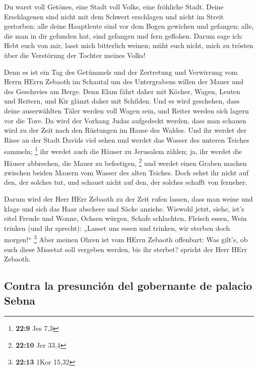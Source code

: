  Du warst voll Getönes, eine Stadt voll Volks, eine
fröhliche Stadt. Deine Erschlagenen sind nicht mit dem Schwert
erschlagen und nicht im Streit gestorben;  alle deine
Hauptleute sind vor dem Bogen gewichen und gefangen; alle, die man in
dir gefunden hat, sind gefangen und fern geflohen.  Darum
sage ich: Hebt euch von mir, lasst mich bitterlich weinen; müht euch
nicht, mich zu trösten über die Verstörung der Tochter meines Volks!

 Denn es ist ein Tag des Getümmels und der Zertretung und
Verwirrung vom Herrn HErrn Zebaoth im Schautal um des Untergrabens
willen der Mauer und des Geschreies am Berge.  Denn Elam
fährt daher mit Köcher, Wagen, Leuten und Reitern, und Kir glänzt daher
mit Schilden.  Und es wird geschehen, dass deine
auserwählten Täler werden voll Wagen sein, und Reiter werden sich lagern
vor die Tore.  Da wird der Vorhang Judas aufgedeckt
werden, dass man schauen wird zu der Zeit nach den Rüstungen im Hause
des Waldes.  Und ihr werdet der Risse an der Stadt Davids
viel sehen und werdet das Wasser des unteren Teiches sammeln;
\footnote{\textbf{22:9} Jes 7,3}  ihr werdet auch die
Häuser zu Jerusalem zählen; ja, ihr werdet die Häuser abbrechen, die
Mauer zu befestigen, \footnote{\textbf{22:10} Jer 33,4} 
und werdet einen Graben machen zwischen beiden Mauern vom Wasser des
alten Teiches. Doch sehet ihr nicht auf den, der solches tut, und
schauet nicht auf den, der solches schafft von ferneher.

 Darum wird der Herr HErr Zebaoth zu der Zeit rufen
lassen, dass man weine und klage und sich das Haar abschere und Säcke
anziehe.  Wiewohl jetzt, siehe, ist's eitel Freude und
Wonne, Ochsen würgen, Schafe schlachten, Fleisch essen, Wein trinken
(und ihr sprecht): „Lasset uns essen und trinken, wir sterben doch
morgen!{}`` \footnote{\textbf{22:13} 1Kor 15,32}  Aber
meinen Ohren ist vom HErrn Zebaoth offenbart: Was gilt's, ob euch diese
Missetat soll vergeben werden, bis ihr sterbet? spricht der Herr HErr
Zebaoth.

\hypertarget{contra-la-presunciuxf3n-del-gobernante-de-palacio-sebna}{%
\subsection{Contra la presunción del gobernante de palacio
Sebna}\label{contra-la-presunciuxf3n-del-gobernante-de-palacio-sebna}}

